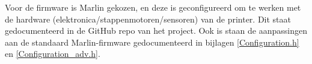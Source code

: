Voor de firmware is Marlin gekozen, en deze is geconfigureerd om te werken met
de hardware (elektronica/stappenmotoren/sensoren) van de printer. Dit staat
gedocumenteerd in de GitHub repo van het project. Ook is staan de aanpassingen
aan de standaard Marlin-firmware gedocumenteerd in bijlagen
\ref{Configuration.h} en \ref{Configuration_adv.h}.


